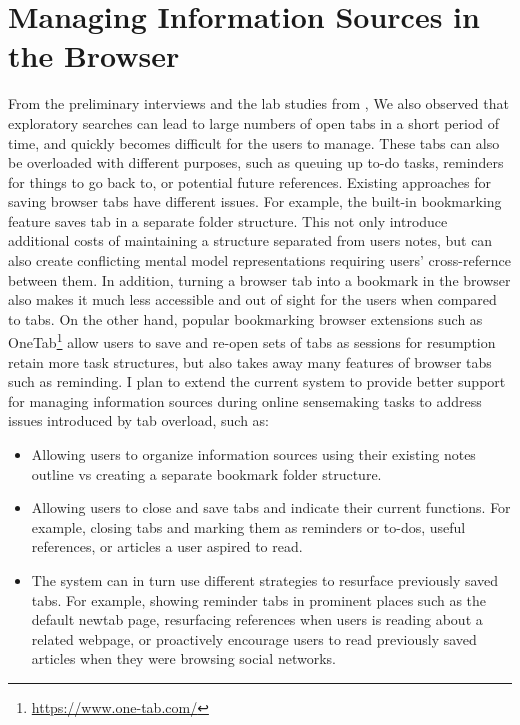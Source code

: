 \section{Managing Information Sources in the Browser}%

From the preliminary interviews and the lab studies from , We also observed that exploratory searches can lead to large numbers of open tabs in a short period of time, and quickly becomes difficult for the users to manage. These tabs can also be overloaded with different purposes, such as queuing up to-do tasks, reminders for things to go back to, or potential future references. Existing approaches for saving browser tabs have different issues. For example, the built-in bookmarking feature saves tab in a separate folder structure. This not only introduce additional costs of maintaining a structure separated from users notes, but can also create conflicting mental model representations requiring users' cross-refernce between them. In addition, turning a browser tab into a bookmark in the browser also makes it much less accessible and out of sight for the users when compared to tabs. On the other hand, popular bookmarking browser extensions such as OneTab\footnote{\url{https://www.one-tab.com/}} allow users to save and re-open sets of tabs as sessions for resumption retain more task structures, but also takes away many features of browser tabs such as reminding. I plan to extend the current system to provide better support for managing information sources during online sensemaking tasks to address issues introduced by tab overload, such as:

\begin{itemize}
    \item Allowing users to organize information sources using their existing notes outline vs creating a separate bookmark folder structure.
    \item Allowing users to close and save tabs and indicate their current functions. For example, closing tabs and marking them as reminders or to-dos, useful references, or articles a user aspired to read.
    \item The system can in turn use different strategies to resurface previously saved tabs. For example, showing reminder tabs in prominent places such as the default newtab page, resurfacing references when users is reading about a related webpage, or proactively encourage users to read previously saved articles when they were browsing social networks.
\end{itemize}

